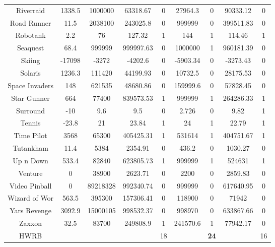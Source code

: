 \begin{table}[!hb]
\begin{center}
\begin{tabular}{c cc cc cc cc}
        Riverraid & 1338.5 & 1000000 & 63318.67 & 0  & 27964.3 & 0 & 90333.12	& 0\\  
        Road Runner & 11.5 & 2038100 & 243025.8 & 0  & 999999 & 0  & 399511.83	& 0\\  
        Robotank & 2.2 & 76 & 127.32 & 1  & 144 & 1  & 114.46	& 1\\  
        Seaquest & 68.4 & 999999 & 999997.63 & 0  & 1000000 & 1 & 960181.39	& 0 \\  
        Skiing & -17098 & -3272 & -4202.6 & 0  & -5903.34 & 0 & -3273.43	& 0 \\  
        Solaris & 1236.3 & 111420 & 44199.93 & 0  & 10732.5 & 0  & 28175.53	& 0\\  
        Space Invaders & 148 & 621535 & 48680.86 & 0  & 159999.6 & 0 & 57828.45	& 0 \\  
        Star Gunner & 664 & 77400 & 839573.53 & 1  & 999999 & 1 & 264286.33	& 1 \\  
        Surround & -10 & 9.6 & 9.5 & 0  & 2.726 & 0  & 9.82	&1\\  
        Tennis & -23.8 & 21 & 23.84 & 1  & 24 & 1  & 22.79	&1\\  
        Time Pilot & 3568 & 65300 & 405425.31 & 1  & 531614 & 1 & 404751.67	& 1 \\  
        Tutankham & 11.4 & 5384 & 2354.91 & 0  & 436.2 & 0  & 1030.27	&0\\  
        Up n Down & 533.4 & 82840 & 623805.73 & 1  & 999999 & 1 & 524631	& 1 \\  
        Venture & 0 & 38900 & 2623.71 & 0  & 2200 & 0  & 2859.83	& 0\\  
        Video Pinball & 0 & 89218328 & 992340.74 & 0  & 999999 & 0 & 617640.95	& 0 \\  
        Wizard of Wor & 563.5 & 395300 & 157306.41 & 0  & 118900 & 0  & 71942	& 0\\  
        Yars Revenge & 3092.9 & 15000105 & 998532.37 & 0  & 998970 & 0 & 633867.66	& 0  \\  
        Zaxxon & 32.5 & 83700 & 249808.9 & 1  & 241570.6 & 1  & 77942.17	&0\\ 
        \midrule
         HWRB & & & & 18 & & \textbf{24}& & 16 \\ 
        \bottomrule
\end{tabular}
\end{center}
\end{table}


\clearpage  




